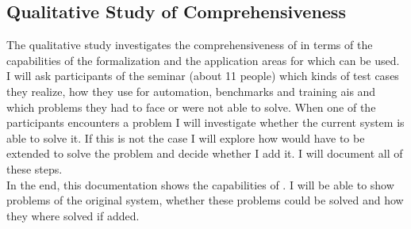 \subsection{Qualitative Study of Comprehensiveness}
The qualitative study investigates the comprehensiveness of \drivebuild{} in terms of the capabilities of the formalization and the application areas for which \drivebuild{} can be used.
I will ask participants of the seminar (about 11 people) which kinds of test cases they realize, how they use \drivebuild{} for automation, benchmarks and training \glspl{ai} and which problems they had to face or were not able to solve.
When one of the participants encounters a problem I will investigate whether the current system is able to solve it.
If this is not the case I will explore how \drivebuild{} would have to be extended to solve the problem and decide whether I add it.
I will document all of these steps.\\
In the end, this documentation shows the capabilities of \drivebuild{}.
I will be able to show problems of the original system, whether these problems could be solved and how they where solved if added.
